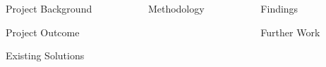 \documentclass{beamer}
\date{\today}
\begin{document}
\begin{frame}[t]
  \begin{columns}[t]

    \separatorcolumn

    \begin{column}{\midspace}
      \begin{block}{Project Background}

      \end{block}


      \begin{block}{Project Outcome}
      \end{block}


      \begin{block}{Existing Solutions}
      \end{block}
    \end{column}

    \separatorcolumn

    \begin{column}{\midspace}
      \begin{block}{Methodology}
      \end{block}
    \end{column}

    \separatorcolumn

    \begin{column}{\midspace}
      \begin{block}{Findings}
      \end{block}

      \begin{block}{Further Work}
      \end{block}
    \end{column}

  \end{columns}
\end{frame}
\end{document}

